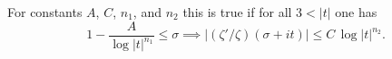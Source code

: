 \begin{definition}[LogDerivZetaHasBound]
\label{LogDerivZetaHasBound}
\leanok
For constants $A$, $C$, $n_1$, and $n_2$ this is true if for all $3<|t|$ one has
  $$1-\frac{A}{\log|t|^{n_1}}\leq\sigma\implies|(\zeta'/\zeta)(\sigma+it)|\leq C\,\log|t|^{n_2}.$$
\end{definition}
